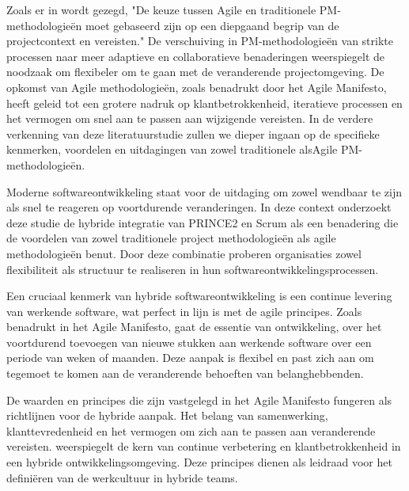\documentclass[dutch]{hogent-article}
\begin{document}
Zoals er in \textcite{Demianchuk2020} wordt gezegd, "De keuze tussen Agile en traditionele PM-methodologieën moet gebaseerd zijn op een diepgaand begrip van de projectcontext en vereisten."
De verschuiving in PM-methodologieën van strikte processen naar meer adaptieve en collaboratieve benaderingen weerspiegelt de noodzaak om flexibeler om te gaan met de veranderende projectomgeving. De opkomst van Agile methodologieën, zoals benadrukt door het Agile Manifesto, heeft geleid tot een grotere nadruk op klantbetrokkenheid, iteratieve processen en het vermogen om snel aan te \linebreak passen aan wijzigende vereisten. In de verdere verkenning van deze literatuurstudie zullen we dieper ingaan op de specifieke kenmerken, voordelen en uitdagingen van zowel traditionele als\linebreak Agile PM-methodologieën.\autocite{Demianchuk2020}
\newline
\newline


Moderne softwareontwikkeling staat voor de uitdaging om zowel wendbaar te zijn als snel te \linebreak reageren op voortdurende veranderingen. In deze context onderzoekt deze studie de hybride \linebreak integratie van PRINCE2 en Scrum als een benadering die de voordelen van zowel traditionele project \linebreak methodologieën als agile methodologieën benut. Door deze combinatie proberen organisaties \linebreak zowel flexibiliteit als structuur te realiseren in hun softwareontwikkelingsprocessen.
\newline

Een cruciaal kenmerk van hybride softwareontwikkeling is een continue levering van werkende \linebreak software, wat perfect in lijn is met de agile principes. Zoals \textcite{PoniszewskaMaranda2022} \linebreak benadrukt in het Agile Manifesto, gaat de essentie van ontwikkeling, over het voortdurend toevoegen van nieuwe stukken aan werkende software over een periode van weken of maanden. Deze aanpak is flexibel en past zich aan om tegemoet te komen aan de veranderende behoeften van \linebreak belanghebbenden.
\newline

De waarden en principes die zijn vastgelegd in het Agile Manifesto fungeren als richtlijnen voor de hybride aanpak. Het belang van samenwerking, klanttevredenheid en het vermogen om zich aan te passen aan veranderende vereisten. \textcite{Fowler2020} weerspiegelt de kern van continue verbetering en klantbetrokkenheid in een hybride ontwikkelingsomgeving. Deze principes dienen als leidraad voor het definiëren van de werkcultuur in hybride teams.
\newline
\end{document}
